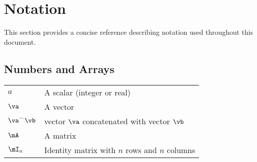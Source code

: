 
\chapter*{Notation}\label{notation}

This section provides a concise reference describing notation used throughout this document.


\section*{Numbers and Arrays}
\bgroup{}
\begin{tabular}{>{\centering}p{1.2in}p{3.5in}}
  \(\displaystyle a~\) & A scalar (integer or real) \\
  \(\displaystyle \va~\) & A vector\\
  \(\displaystyle \va^\frown\vb\) & vector \(\va\) concatenated with vector \(\vb\)\\
  \(\displaystyle \mA~\) & A matrix\\
  \(\displaystyle \mI_n~\) & Identity matrix with  \(n\) rows and  \(n\) columns\\
\end{tabular}

\egroup{}

